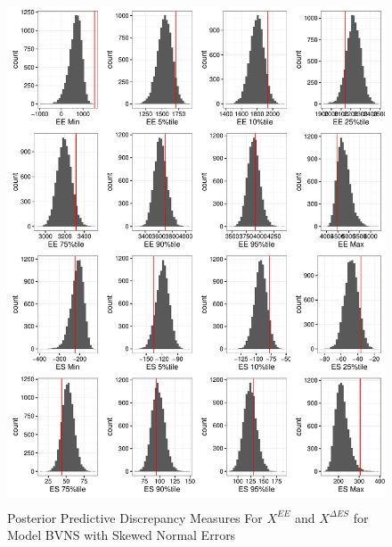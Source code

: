 \documentclass[11pt]{article}\usepackage[]{graphicx}\usepackage[]{color}
\begin{document}
% 
% 
 \begin{figure}
  \centering
  \includegraphics[width=17cm,height=15cm]{manual_figure/wpxdiagbvns.pdf}
  \caption{Posterior Predictive Discrepancy Measures For $X^{EE}$ and $X^{\Delta ES}$ for Model BVNS with Skewed Normal Errors}
  \label{wpxdiagbvns}
  \end{figure}
\end{document}
